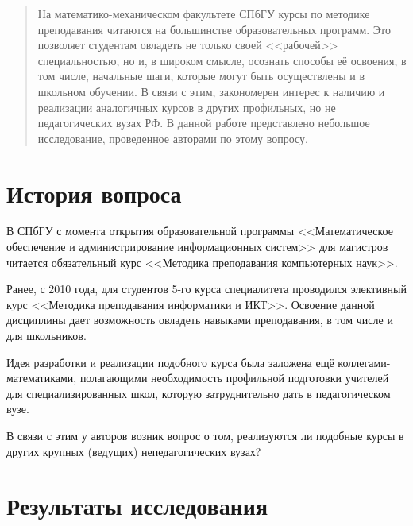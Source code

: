 \documentclass{math-mech-sci}
\begin{document}
\maketitle

\begin{abstract}
На математико-механическом факультете СПбГУ курсы по методике преподавания читаются на большинстве образовательных программ. Это позволяет студентам овладеть не только своей <<рабочей>> специальностью, но и, в широком смысле, осознать способы её освоения, в том числе, начальные шаги, которые могут быть осуществлены и в школьном обучении. В связи с этим, закономерен интерес к наличию и реализации аналогичных курсов в других профильных, но не педагогических вузах РФ. В данной работе представлено небольшое исследование, проведенное авторами по этому вопросу.
\end{abstract}

\section{История вопроса}

В СПбГУ с момента открытия образовательной программы <<Математическое обеспечение и администрирование информационных систем>> для магистров читается обязательный курс <<Методика преподавания компьютерных наук>>. 

Ранее, с 2010 года, для студентов 5-го курса специалитета проводился элективный курс <<Методика преподавания информатики и ИКТ>>.
Освоение данной дисциплины дает возможность овладеть навыками преподавания, в том числе и для школьников.

Идея разработки и реализации подобного курса была заложена ещё коллегами-математиками, полагающими необходимость профильной подготовки учителей для специализированных школ, которую затруднительно дать в педагогическом вузе.

В связи с этим у авторов возник вопрос о том, реализуются ли подобные курсы в других крупных (ведущих) непедагогических вузах?

\section{Результаты исследования}

\end{document}
